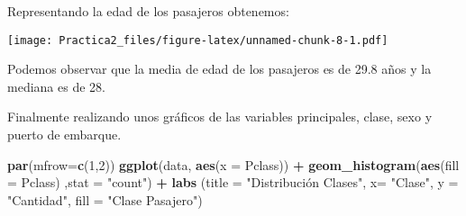 \documentclass[]{article}
\newenvironment{Shaded}{\begin{snugshade}}{\end{snugshade}}
\newcommand{\KeywordTok}[1]{\textcolor[rgb]{0.13,0.29,0.53}{\textbf{#1}}}
\newcommand{\DataTypeTok}[1]{\textcolor[rgb]{0.13,0.29,0.53}{#1}}
\newcommand{\DecValTok}[1]{\textcolor[rgb]{0.00,0.00,0.81}{#1}}
\newcommand{\FloatTok}[1]{\textcolor[rgb]{0.00,0.00,0.81}{#1}}
\newcommand{\StringTok}[1]{\textcolor[rgb]{0.31,0.60,0.02}{#1}}
\newcommand{\CommentTok}[1]{\textcolor[rgb]{0.56,0.35,0.01}{\textit{#1}}}
\newcommand{\OperatorTok}[1]{\textcolor[rgb]{0.81,0.36,0.00}{\textbf{#1}}}
\newcommand{\NormalTok}[1]{#1}
\begin{document}
Representando la edad de los pasajeros obtenemos:

\begin{Shaded}
\end{Shaded}

\texttt{[image: Practica2\_files/figure-latex/unnamed-chunk-8-1.pdf]}

Podemos observar que la media de edad de los pasajeros es de 29.8 años y
la mediana es de 28.

Finalmente realizando unos gráficos de las variables principales, clase,
sexo y puerto de embarque.

\begin{Shaded}
\begin{Highlighting}[]
\KeywordTok{par}\NormalTok{(}\DataTypeTok{mfrow=}\KeywordTok{c}\NormalTok{(}\DecValTok{1}\NormalTok{,}\DecValTok{2}\NormalTok{))}
\KeywordTok{ggplot}\NormalTok{(data,  }\KeywordTok{aes}\NormalTok{(}\DataTypeTok{x =}\NormalTok{ Pclass)) }\OperatorTok{+}
\StringTok{  }\KeywordTok{geom_histogram}\NormalTok{(}\KeywordTok{aes}\NormalTok{(}\DataTypeTok{fill =}\NormalTok{ Pclass) ,}\DataTypeTok{stat =} \StringTok{"count"}\NormalTok{) }\OperatorTok{+}\StringTok{ }
\StringTok{  }\KeywordTok{labs}\NormalTok{ (}\DataTypeTok{title =} \StringTok{"Distribución Clases"}\NormalTok{, }\DataTypeTok{x=} \StringTok{"Clase"}\NormalTok{, }\DataTypeTok{y =} \StringTok{"Cantidad"}\NormalTok{, }\DataTypeTok{fill =} \StringTok{"Clase Pasajero"}\NormalTok{)}
\end{Highlighting}
\end{Shaded}
\end{document}
